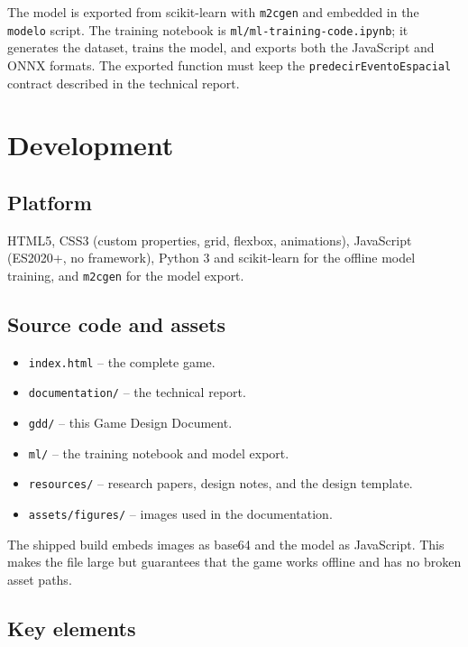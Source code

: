 \documentclass[11pt,a4paper]{article}
\newcommand{\code}[1]{\texttt{#1}}
\begin{document}
The model is exported from scikit-learn with \code{m2cgen} and embedded in the \code{modelo} script. The training notebook is \code{ml/ml-training-code.ipynb}; it generates the dataset, trains the model, and exports both the JavaScript and ONNX formats. The exported function must keep the \code{predecirEventoEspacial} contract described in the technical report.

\section{Development}

\subsection{Platform}

HTML5, CSS3 (custom properties, grid, flexbox, animations), JavaScript (ES2020+, no framework), Python 3 and scikit-learn for the offline model training, and \code{m2cgen} for the model export.

\subsection{Source code and assets}

\begin{itemize}
  \item \code{index.html} -- the complete game.
  \item \code{documentation/} -- the technical report.
  \item \code{gdd/} -- this Game Design Document.
  \item \code{ml/} -- the training notebook and model export.
  \item \code{resources/} -- research papers, design notes, and the design template.
  \item \code{assets/figures/} -- images used in the documentation.
\end{itemize}

The shipped build embeds images as base64 and the model as JavaScript. This makes the file large but guarantees that the game works offline and has no broken asset paths.

\subsection{Key elements}
\end{document}
